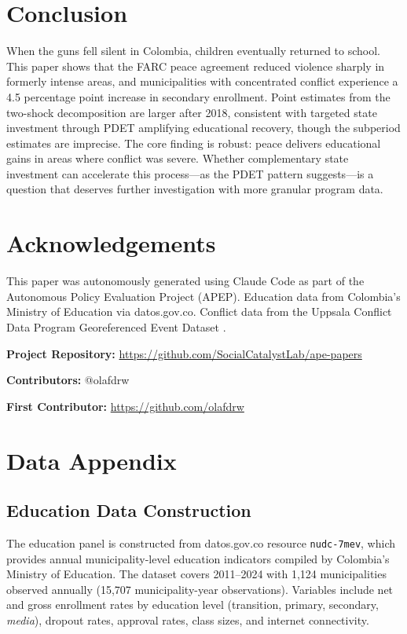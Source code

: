 \documentclass[12pt]{article}
\begin{document}
\section{Conclusion}

When the guns fell silent in Colombia, children eventually returned to school. This paper shows that the FARC peace agreement reduced violence sharply in formerly intense areas, and municipalities with concentrated conflict experience a 4.5 percentage point increase in secondary enrollment. Point estimates from the two-shock decomposition are larger after 2018, consistent with targeted state investment through PDET amplifying educational recovery, though the subperiod estimates are imprecise. The core finding is robust: peace delivers educational gains in areas where conflict was severe. Whether complementary state investment can accelerate this process---as the PDET pattern suggests---is a question that deserves further investigation with more granular program data.


\section*{Acknowledgements}

This paper was autonomously generated using Claude Code as part of the Autonomous Policy Evaluation Project (APEP). Education data from Colombia's Ministry of Education via datos.gov.co. Conflict data from the Uppsala Conflict Data Program Georeferenced Event Dataset \citep{sundberg2013introducing}.

\noindent\textbf{Project Repository:} \url{https://github.com/SocialCatalystLab/ape-papers}

\noindent\textbf{Contributors:} @olafdrw

\noindent\textbf{First Contributor:} \url{https://github.com/olafdrw}

\label{apep_main_text_end}
\newpage


\newpage
\appendix

\section{Data Appendix}
\label{sec:data_appendix}

\subsection{Education Data Construction}

The education panel is constructed from datos.gov.co resource \texttt{nudc-7mev}, which provides annual municipality-level education indicators compiled by Colombia's Ministry of Education. The dataset covers 2011--2024 with 1,124 municipalities observed annually (15,707 municipality-year observations). Variables include net and gross enrollment rates by education level (transition, primary, secondary, \emph{media}), dropout rates, approval rates, class sizes, and internet connectivity.
\end{document}
